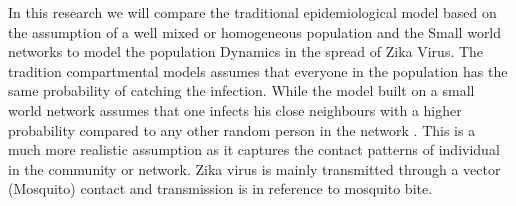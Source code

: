 In this research we will compare the traditional epidemiological model based on the  assumption of a well mixed or homogeneous population and the Small world networks to model the population Dynamics in the spread of Zika Virus. The tradition compartmental models assumes that everyone in the population has the same probability of catching the infection. While  the model built on a small world network assumes that  one infects his close neighbours with a higher probability compared to any other random person in the network \citep{newman2002random}. This is a much more realistic assumption as it captures the contact patterns of individual in the community or network. Zika virus is mainly transmitted through a vector (Mosquito) contact and transmission is in reference to mosquito bite.



